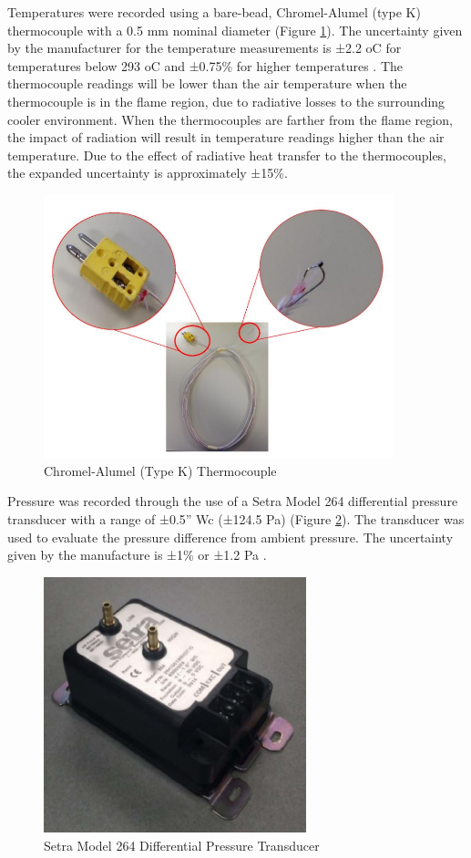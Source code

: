 \documentclass{article}
\begin{document}
Temperatures were recorded using a bare-bead, Chromel-Alumel (type K) thermocouple with a 0.5 mm nominal diameter (Figure \ref{fig:Thermocouple}). The uncertainty given by the manufacturer for the temperature measurements is ±2.2 oC for temperatures below 293 oC and ±0.75\% for higher temperatures \cite{TemperatureHandbook}. The thermocouple readings will be lower than the air temperature when the thermocouple is in the flame region, due to radiative losses to the surrounding cooler environment. When the thermocouples are farther from the flame region, the impact of radiation will result in temperature readings higher than the air temperature. Due to the effect of radiative heat transfer to the thermocouples, the expanded uncertainty is approximately ±15\%.

\begin{figure} [H]
	\centering
	\includegraphics[width = 4in]{0_Images/Instrumentation/Thermocouple.jpg}
	\caption{Chromel-Alumel (Type K) Thermocouple}
	\label{fig:Thermocouple}
\end{figure}

Pressure was recorded through the use of a Setra Model 264 differential pressure transducer with a range of ±0.5” Wc (±124.5 Pa) (Figure \ref{fig:Setra}). The transducer was used to evaluate the pressure difference from ambient pressure. The uncertainty given by the manufacture is ±1\% or ±1.2 Pa \cite{SetraManual}.

\begin{figure} [H]
	\centering
	\includegraphics[width = 3in]{0_Images/Instrumentation/Setra.jpg}
	\caption{Setra Model 264 Differential Pressure Transducer}
	\label{fig:Setra}
\end{figure}
\end{document}
